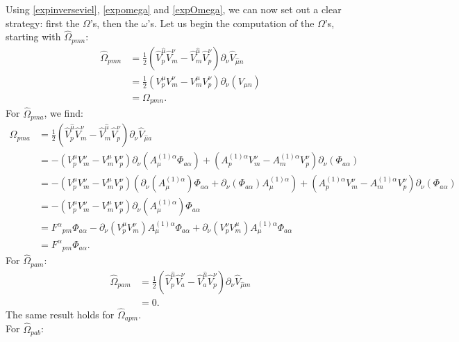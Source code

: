 \documentclass{article}
\begin{document}
Using \eqref{expinverseviel}, \eqref{expomega} and \eqref{expOmega}, we can now set out a clear strategy: first the $\Omega$'s, then the $\omega$'s.
Let us begin the computation of the $\Omega$'s, starting with $\hat \Omega_{pmn}$:
\begin{align*}
    \hat \Omega_{pmn} &= \frac{1}{2}(\hat V^{\hat \mu}_{  p} \hat V^{ \nu}_{m}-\hat V^{\hat \mu}_{m} \hat V^{ \nu}_{p})\partial_{ \nu} \hat V_{\hat \mu n}\\
    &= \frac{1}{2}(V^{ \mu}_{  p} V^{ \nu}_{m}- V^{ \mu}_{m} V^{ \nu}_{p})\partial_{ \nu} ( V_{ \mu n})\\
    &= \Omega_{pmn}.
\end{align*}
For $\hat \Omega_{pma}$, we find:
\begin{align*}
    \hat \Omega_{pma} &= \frac{1}{2}(\hat V^{\hat \mu}_{  p} \hat V^{ \nu}_{m}-\hat V^{\hat \mu}_{m} \hat V^{ \nu}_{p})\partial_{ \nu} \hat V_{\hat \mu a}\\
    &= -( V^{\mu}_{  p}  V^{ \nu}_{m}-  V^{ \mu}_{m} V^{ \nu}_{p})\partial_{ \nu} (A^{(1)\alpha}_{\mu}\Phi_{a\alpha}) + ( A^{(1)\alpha}_p V^{ \nu}_{m}- A^{(1)\alpha}_{m} V^{ \nu}_{p})\partial_{ \nu} (\Phi_{a\alpha})\\
    &= - (V^{ \mu}_{  p}  V^{ \nu}_{m}- V^{ \mu}_{m}  V^{ \nu}_{p})(\partial_{ \nu} (A^{(1)\alpha}_{\mu})\Phi_{a\alpha}+\partial_{ \nu}(\Phi_{a\alpha})A^{(1)\alpha}_{\mu}) + ( A^{(1)\alpha}_p V^{ \nu}_{m}- A^{(1)\alpha}_{m} V^{ \nu}_{p})\partial_{ \nu} (\Phi_{a\alpha}) \\
    &= - (V^{ \mu}_{  p}  V^{ \nu}_{m}- V^{ \mu}_{m}  V^{ \nu}_{p})\partial_{ \nu} (A^{(1)\alpha}_{\mu})\Phi_{a\alpha}\\
    &=  F^\alpha{}_{pm}\Phi_{a\alpha}- \partial_\nu(V^{ \mu}_{  p}  V^{ \nu}_{m})A^{(1)\alpha}_{\mu}\Phi_{a\alpha}+ \partial_\nu(V^{ \nu}_{  p}  V^{ \mu}_{m})A^{(1)\alpha}_{\mu}\Phi_{a\alpha}\\
    &=  F^\alpha{}_{pm}\Phi_{a\alpha}.
\end{align*}
For $\hat \Omega_{pam}$:
\begin{align*}
    \hat \Omega_{pam} &= \frac{1}{2}(\hat V^{\hat \mu}_{  p} \hat V^{ \nu}_{a}-\hat V^{\hat \mu}_{a} \hat V^{ \nu}_{p})\partial_{ \nu} \hat V_{\hat \mu m}\\
    &= 0.
\end{align*}
The same result holds for $\hat \Omega_{apm}$.\\
For $\hat \Omega_{pab}$:
\end{document}
